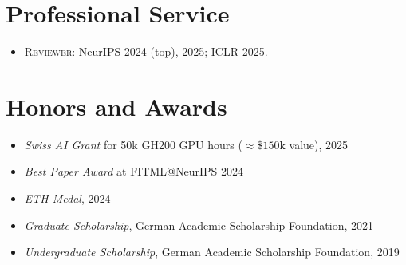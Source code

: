 \documentclass[a4paper,12pt]{article}
\begin{document}
\section*{Professional Service}
\begin{itemize}[leftmargin=1.5em]
  \item \textsc{Reviewer:} NeurIPS 2024 (top), 2025; ICLR 2025.
\end{itemize}

\section*{Honors and Awards}
\begin{itemize}[leftmargin=1.5em]
  \item \emph{Swiss AI Grant} for 50k GH200 GPU hours ($\approx\!\$150\mathrm{k}$ value), 2025
  \item \emph{Best Paper Award} at FITML@NeurIPS 2024
  \item \emph{ETH Medal}, 2024
  \item \emph{Graduate Scholarship}, German Academic Scholarship Foundation, 2021
  \item \emph{Undergraduate Scholarship}, German Academic Scholarship Foundation, 2019
\end{itemize}
\end{document}
